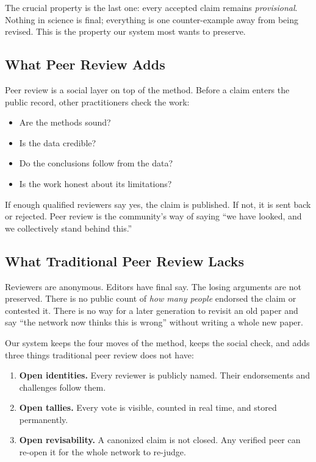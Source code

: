 \documentclass[11pt,a4paper]{article}
\begin{document}
The crucial property is the last one: every accepted claim remains
\emph{provisional}. Nothing in science is final; everything is one
counter-example away from being revised. This is the property our
system most wants to preserve.

\subsection{What Peer Review Adds}

Peer review is a social layer on top of the method. Before a claim
enters the public record, other practitioners check the work:

\begin{itemize}[leftmargin=1.5em]
  \item Are the methods sound?
  \item Is the data credible?
  \item Do the conclusions follow from the data?
  \item Is the work honest about its limitations?
\end{itemize}

If enough qualified reviewers say yes, the claim is published. If not,
it is sent back or rejected. Peer review is the community's way of
saying ``we have looked, and we collectively stand behind this.''

\subsection{What Traditional Peer Review Lacks}

Reviewers are anonymous. Editors have final say. The losing arguments
are not preserved. There is no public count of \emph{how many people}
endorsed the claim or contested it. There is no way for a later
generation to revisit an old paper and say ``the network now thinks
this is wrong'' without writing a whole new paper.

Our system keeps the four moves of the method, keeps the social check,
and adds three things traditional peer review does not have:

\begin{notebox}
\begin{enumerate}[leftmargin=1.5em]
  \item \textbf{Open identities.} Every reviewer is publicly named.
        Their endorsements and challenges follow them.
  \item \textbf{Open tallies.} Every vote is visible, counted in real
        time, and stored permanently.
  \item \textbf{Open revisability.} A canonized claim is not closed.
        Any verified peer can re-open it for the whole network to
        re-judge.
\end{enumerate}
\end{notebox}
\end{document}
